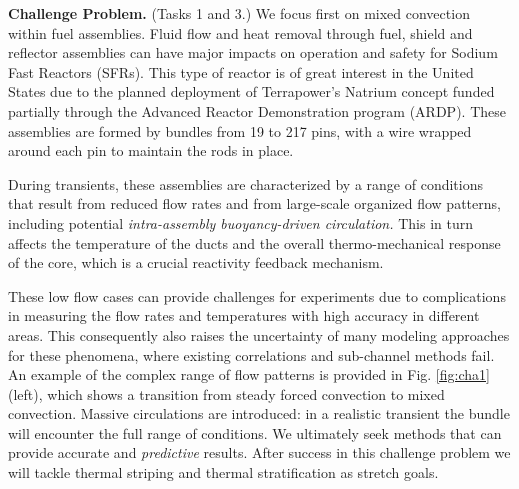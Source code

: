 \noindent \textbf{Challenge Problem.} (Tasks 1 and 3.)
We focus first on mixed convection within fuel assemblies. Fluid flow and heat
removal through fuel, shield and reflector assemblies  can have major impacts
on operation and safety for Sodium Fast Reactors (SFRs).  This type of reactor
is of great interest in the United States due to the planned  deployment of
Terrapower's Natrium concept funded partially through the Advanced Reactor
Demonstration program (ARDP). These assemblies are formed by bundles from 19 to
217 pins, with a wire wrapped around each pin to maintain the rods in place.

During transients, these assemblies are characterized by a range of conditions
that result from reduced flow rates and from large-scale organized flow
patterns, including potential \textit{intra-assembly buoyancy-driven circulation.} 
This in turn affects the temperature of the ducts and the overall thermo-mechanical
response of the core, which is a crucial reactivity feedback mechanism.

These low flow cases can provide challenges for experiments due to
complications in measuring the flow rates and temperatures with high accuracy
in different areas. This consequently also raises the uncertainty of many
modeling approaches for these phenomena, where existing correlations and
sub-channel methods fail. An example of the complex range of flow patterns is
provided in Fig. \ref{fig:cha1}(left), which shows a transition from steady forced
convection to mixed convection.  Massive circulations are introduced: in a
realistic transient the bundle will encounter the full range of conditions. We
ultimately seek methods that can provide accurate and \textit{predictive}
results. After success in this challenge problem we will tackle thermal
striping and thermal stratification as stretch goals.
